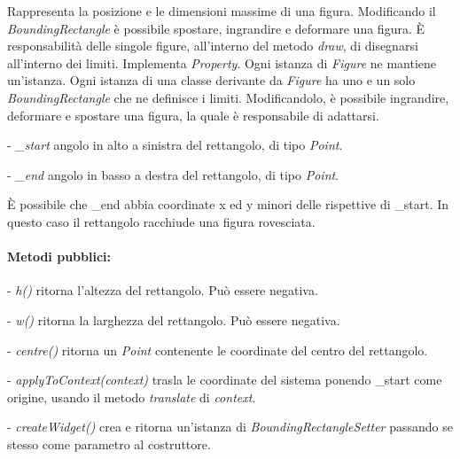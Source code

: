 Rappresenta la posizione e le dimensioni massime di una figura. Modificando il
\textit{BoundingRectangle} \`e possibile spostare, ingrandire e deformare una figura.
\`E responsabilit\`a delle singole figure, all'interno del metodo \textit{draw}, di disegnarsi all'interno dei limiti.
Implementa \textit{Property}. Ogni istanza di \textit{Figure} ne mantiene un'istanza.
Ogni istanza di una classe derivante da \textit{Figure} ha uno e un solo \textit{BoundingRectangle} che ne definisce i limiti. Modificandolo, \`e possibile ingrandire, deformare e spostare una figura, la quale \`e responsabile di adattarsi.
\begin{elencopuntato}[\subsubsecindent]
\item[-] \textit{{\_}start} angolo in alto a sinistra del rettangolo, di tipo \textit{Point}.
\item[-] \textit{{\_}end} angolo in basso a destra del rettangolo, di tipo \textit{Point}.
\end{elencopuntato}
\`E possibile che {\_}end abbia coordinate x ed y minori delle rispettive di {\_}start. In questo caso il rettangolo racchiude una figura rovesciata.
\paragraph{Metodi pubblici:}
\begin{elencopuntato}[\subsubsecindent]
\item[-] \textit{h()} ritorna l'altezza del rettangolo. Pu\`o essere negativa.
\item[-] \textit{w()} ritorna la larghezza del rettangolo. Pu\`o essere negativa.
\item[-] \textit{centre()} ritorna un \textit{Point} contenente le coordinate del centro del rettangolo.
\item[-] \textit{applyToContext(context)} trasla le coordinate del sistema ponendo {\_}start come origine, usando il metodo \textit{translate} di \textit{context}.
\item[-] \textit{createWidget()} crea e ritorna un'istanza di \textit{BoundingRectangleSetter} passando se stesso come parametro al costruttore.
\end{elencopuntato}


